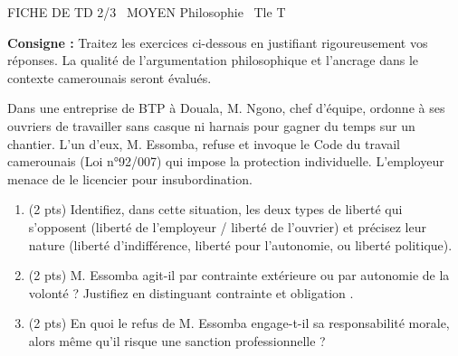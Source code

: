 \documentclass[11pt]{article}
\begin{document}
\begin{tcolorbox}[enhanced,colback=popink,colframe=popink,arc=10pt,boxrule=0pt,left=12pt,right=12pt,top=9pt,bottom=9pt]
{\color{white}\popxbold\small FICHE DE TD 2/3 \textbullet\ MOYEN \hfill Philosophie \textbullet\ Tle T\par}
\end{tcolorbox}
\vspace{4pt}
\noindent\textbf{Consigne :} Traitez les exercices ci-dessous en justifiant rigoureusement vos réponses. La qualité de l'argumentation philosophique et l'ancrage dans le contexte camerounais seront évalués.

\begin{exercice}
Dans une entreprise de BTP à Douala, M. Ngono, chef d'équipe, ordonne à ses ouvriers de travailler sans casque ni harnais pour gagner du temps sur un chantier. L'un d'eux, M. Essomba, refuse et invoque le Code du travail camerounais (Loi n°92/007) qui impose la protection individuelle. L'employeur menace de le licencier pour insubordination.
\begin{enumerate}
    \item (2 pts) Identifiez, dans cette situation, les deux types de liberté qui s'opposent (liberté de l'employeur / liberté de l'ouvrier) et précisez leur nature (liberté d'indifférence, liberté pour l'autonomie, ou liberté politique).
    \item (2 pts) M. Essomba agit-il par contrainte extérieure ou par autonomie de la volonté ? Justifiez en distinguant \og contrainte \fg{} et \og obligation \fg{}.
    \item (2 pts) En quoi le refus de M. Essomba engage-t-il sa responsabilité morale, alors même qu'il risque une sanction professionnelle ?
\end{enumerate}
\end{exercice}
\end{document}
